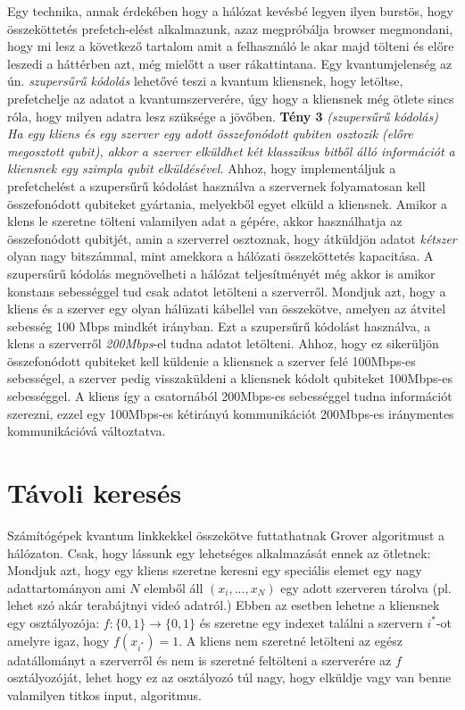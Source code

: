 \indent Egy technika, annak érdekében hogy a hálózat kevésbé legyen ilyen burstös, hogy összeköttetés prefetch-elést alkalmazunk, azaz megpróbálja browser megmondani, hogy mi lesz a következő tartalom amit a felhasználó le akar majd tölteni és előre leszedi a háttérben azt, még mielőtt a user rákattintana.
Egy kvantumjelenség az ún. \textit{szupersűrű kódolás} lehetővé teszi a kvantum kliensnek, hogy letöltse, prefetchelje az adatot a kvantumszerverére, úgy hogy a kliensnek még ötlete sincs róla, hogy milyen adatra lesz szüksége a jövőben.
\vspace{2mm}
\textbf{Tény 3}  \textit{(szupersűrű kódolás) Ha egy kliens és egy szerver egy adott összefonódott qubiten osztozik (előre megosztott qubit), akkor a szerver elküldhet két klasszikus bitből álló információt a kliensnek egy szimpla qubit elküldésével.}
\vspace{2mm}
\indent Ahhoz, hogy implementáljuk a prefetchelést a szupersűrű kódolást használva a szervernek folyamatosan kell összefonódott qubiteket gyártania, melyekből egyet elküld a kliensnek.
Amikor a klens le szeretne tölteni valamilyen adat a gépére, akkor használhatja az összefonódott qubitjét, amin a szerverrel osztoznak, hogy átküldjön adatot \textit{kétszer} olyan nagy bitszámmal, mint amekkora a hálózati összeköttetés kapacitása.
A szupersűrű kódolás megnövelheti a hálózat teljesítményét még akkor is amikor konstans sebességgel tud csak adatot letölteni a szerverről.
Mondjuk azt, hogy a kliens és a szerver egy olyan hálüzati kábellel van összekötve, amelyen az átvitel sebesség 100 Mbps mindkét irányban.
Ezt a szupersűrű kódolást használva, a klens a szerverről \textit{200Mbps}-el tudna adatot letölteni.
Ahhoz, hogy ez sikerüljön összefonódott qubiteket kell küldenie a kliensnek a szerver felé 100Mbps-es sebességel, a szerver pedig visszaküldeni a kliensnek kódolt qubiteket 100Mbps-es sebességgel.
A kliens így a csatornából 200Mbps-es sebességgel tudna információt szerezni, ezzel egy 100Mbps-es kétirányú kommunikációt 200Mbps-es iránymentes kommunikációvá változtatva.
 

\section{Távoli keresés}
\hspace{2mm} Számítógépek kvantum linkkekkel összekötve futtathatnak Grover algoritmust a hálózaton.
Csak, hogy lássunk egy lehetséges alkalmazását ennek az ötletnek: Mondjuk azt, hogy egy kliens szeretne keresni egy speciális elemet egy nagy adattartományon ami $N$ elemből áll $(x_i,...,x_N)$ egy adott szerveren tárolva (pl. lehet szó akár terabájtnyi videó adatról.)
Ebben az esetben lehetne a kliensnek egy osztályozója: $f:\{0,1\}\rightarrow \{0,1\}$ és szeretne egy indexet találni a szervern $i^*$-ot amelyre igaz, hogy $f(x_{i^*})=1$.
A kliens nem szeretné letölteni az egész adatállományt a szerverről és nem is szeretné feltölteni a szerverére az $f$ osztályozóját, lehet hogy ez az osztályozó túl nagy, hogy elküldje vagy van benne valamilyen titkos input, algoritmus.

